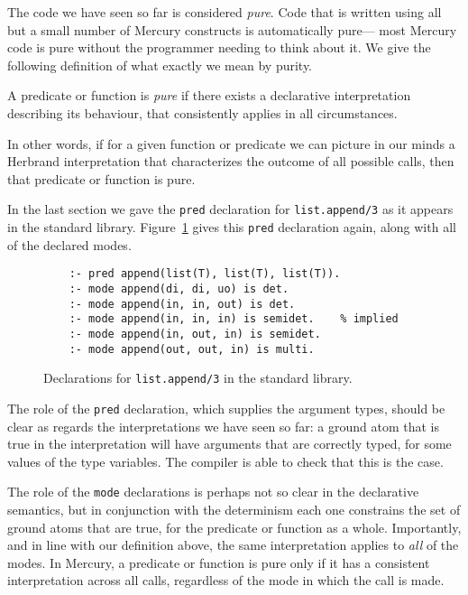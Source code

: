 The code we have seen so far is considered \emph{pure}.
Code that is written using
all but a small number of Mercury constructs
is automatically pure---%
most Mercury code is pure
without the programmer needing to think about it.
We give the following definition
of what exactly we mean by purity.

\begin{definition}[Purity] \label{gi:pure}
A predicate or function is \emph{pure}
if there exists a declarative interpretation describing its behaviour,
that consistently applies in all circumstances.
\end{definition}

\noindent
In other words,
if for a given function or predicate
we can picture in our minds a Herbrand interpretation
that characterizes the outcome of all possible calls,
then that predicate or function is pure.

In the last section we gave
the \texttt{pred} declaration for \texttt{list.append/3}
as it appears in the standard library.
Figure~\ref{fig:append-decls} gives this \texttt{pred} declaration again,
along with all of the declared modes.

\begin{figure}
\begin{verbatim}
    :- pred append(list(T), list(T), list(T)).
    :- mode append(di, di, uo) is det.
    :- mode append(in, in, out) is det.
    :- mode append(in, in, in) is semidet.    % implied
    :- mode append(in, out, in) is semidet.
    :- mode append(out, out, in) is multi.
\end{verbatim}
\caption{Declarations for \texttt{list.append/3} in the standard library.
\label{fig:append-decls}}
\end{figure}

The role of the \texttt{pred} declaration,
which supplies the argument types,
should be clear as regards the interpretations we have seen so far:
a ground atom that is true in the interpretation
will have arguments that are correctly typed,
for some values of the type variables.
The compiler is able to check that this is the case.

The role of the \texttt{mode} declarations
is perhaps not so clear in the declarative semantics,
but in conjunction with the determinism
each one constrains the set of ground atoms that are true,
for the predicate or function as a whole.
Importantly,
and in line with our definition above,
the same interpretation applies to \emph{all} of the modes.
In Mercury, a predicate or function is pure
only if it has a consistent interpretation across all calls,
regardless of the mode in which the call is made.

